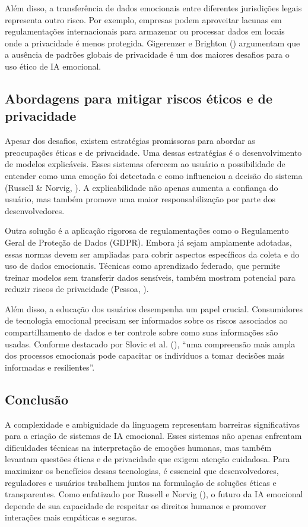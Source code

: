 \documentclass[a4paper,12pt]{report}
\begin{document}
	Além disso, a transferência de dados emocionais entre diferentes jurisdições legais representa outro risco. Por exemplo, empresas podem aproveitar lacunas em regulamentações internacionais para armazenar ou processar dados em locais onde a privacidade é menos protegida. Gigerenzer e Brighton (\citeyear{gigerenzer2009}) argumentam que a ausência de padrões globais de privacidade é um dos maiores desafios para o uso ético de IA emocional.
	
	\subsection{Abordagens para mitigar riscos éticos e de privacidade}
	
	Apesar dos desafios, existem estratégias promissoras para abordar as preocupações éticas e de privacidade. Uma dessas estratégias é o desenvolvimento de modelos explicáveis. Esses sistemas oferecem ao usuário a possibilidade de entender como uma emoção foi detectada e como influenciou a decisão do sistema (Russell \& Norvig, \citeyear{russell2020}). A explicabilidade não apenas aumenta a confiança do usuário, mas também promove uma maior responsabilização por parte dos desenvolvedores.
	
	Outra solução é a aplicação rigorosa de regulamentações como o Regulamento Geral de Proteção de Dados (GDPR). Embora já sejam amplamente adotadas, essas normas devem ser ampliadas para cobrir aspectos específicos da coleta e do uso de dados emocionais. Técnicas como aprendizado federado, que permite treinar modelos sem transferir dados sensíveis, também mostram potencial para reduzir riscos de privacidade (Pessoa, \citeyear{pessoa2008}).
	
	Além disso, a educação dos usuários desempenha um papel crucial. Consumidores de tecnologia emocional precisam ser informados sobre os riscos associados ao compartilhamento de dados e ter controle sobre como suas informações são usadas. Conforme destacado por Slovic et al. (\citeyear{slovic2007}), “uma compreensão mais ampla dos processos emocionais pode capacitar os indivíduos a tomar decisões mais informadas e resilientes”.
	
	\subsection{Conclusão}
	
	A complexidade e ambiguidade da linguagem representam barreiras significativas para a criação de sistemas de IA emocional. Esses sistemas não apenas enfrentam dificuldades técnicas na interpretação de emoções humanas, mas também levantam questões éticas e de privacidade que exigem atenção cuidadosa. Para maximizar os benefícios dessas tecnologias, é essencial que desenvolvedores, reguladores e usuários trabalhem juntos na formulação de soluções éticas e transparentes. Como enfatizado por Russell e Norvig (\citeyear{russell2020}), o futuro da IA emocional depende de sua capacidade de respeitar os direitos humanos e promover interações mais empáticas e seguras.
	
	
	
	\newpage
	
	\printbibliography[title={Referências Bibliográficas}]
	
\end{document}
